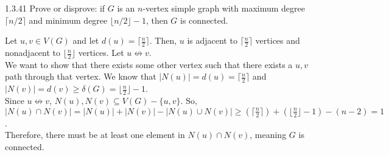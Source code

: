 \documentclass[9pt]{extarticle}
\begin{document}
  \begin{problem}{1.3.41}
    Prove or disprove: if $G$ is an $n$-vertex simple graph with maximum degree $\lceil n/2 \rceil$ and minimum degree $\lfloor n/2 \rfloor - 1$, then $G$ is connected.
  \end{problem}
  \begin{solution}
    Let $u,v\in V(G)$ and let $d(u) = \lceil \frac{n}{2}\rceil$. Then, $u$ is adjacent to $\lceil \frac{n}{2}\rceil$ vertices and nonadjacent to $\lfloor \frac{n}{2}\rfloor$ vertices. Let $u\not\leftrightarrow v$.\\

    We want to show that there exists some other vertex such that there exists a $u,v$ path through that vertex. We know that $|N(u)| = d(u) = \lceil \frac{n}{2}\rceil$ and $|N(v)| = d(v) \geq \delta(G) = \lfloor \frac{n}{2}\rfloor - 1$.\\

    Since $u\not\leftrightarrow v$, $N(u),N(v) \subseteq V(G) - \{u,v\}$. So, $|N(u) \cap N(v)| = |N(u)| + |N(v)| - |N(u) \cup N(v)| \geq \left(\lceil \frac{n}{2}\rceil\right) + \left(\lfloor \frac{n}{2}\rfloor - 1\right) - (n-2) = 1$.\\

    Therefore, there must be at least one element in $N(u)\cap N(v)$, meaning $G$ is connected.
  \end{solution}
\end{document}
